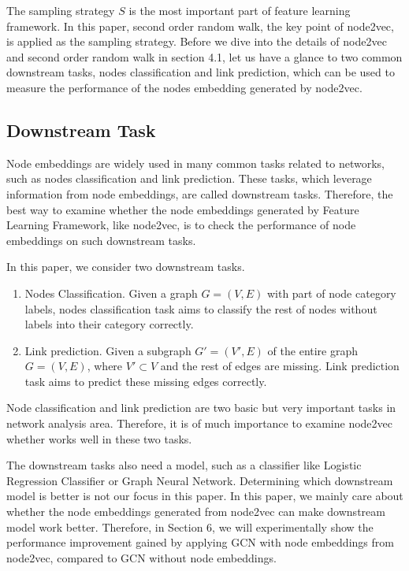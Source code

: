 \documentclass[sigconf]{acmart}
\begin{document}
The sampling strategy $S$ is the most important part of feature learning framework. In this paper,  second order random walk, the key point of node2vec, is applied as the sampling strategy. Before we dive into the details of node2vec and second order random walk in section 4.1, let us have a glance to two common downstream tasks, nodes classification and link prediction, which can be used to measure the performance of the nodes embedding generated by node2vec. 

\subsection{Downstream Task}

Node embeddings are widely used in many common tasks related to networks, such as nodes classification and link prediction. These tasks, which leverage information from node embeddings, are called downstream tasks. Therefore, the best way to examine whether the node embeddings generated by Feature Learning Framework, like node2vec, is to check the performance of node embeddings on such downstream tasks.

In this paper, we consider two downstream tasks.\par
\begin{enumerate}
    \item Nodes Classification. Given a graph $G=(V, E)$ with part of node category labels, nodes classification task aims to classify the rest of nodes without labels into their category correctly.
    \item Link prediction. Given a subgraph $G'=(V',E)$ of the entire graph $G=(V,E)$, where $V'\subset V$ and the rest of edges are missing. Link prediction task aims to predict these missing edges correctly.
\end{enumerate}
Node classification and link prediction are two basic but very important tasks in network analysis area. Therefore, it is of much importance to examine node2vec whether works well in these two tasks.

The downstream tasks also need a model, such as a classifier like Logistic Regression Classifier or Graph Neural Network. Determining which downstream model is better is not our focus in this paper. In this paper, we mainly care about whether the node embeddings generated from node2vec can make downstream model work better. Therefore, in Section 6, we will experimentally show the performance improvement gained by applying GCN with node embeddings from node2vec, compared to GCN without node embeddings.
\end{document}
